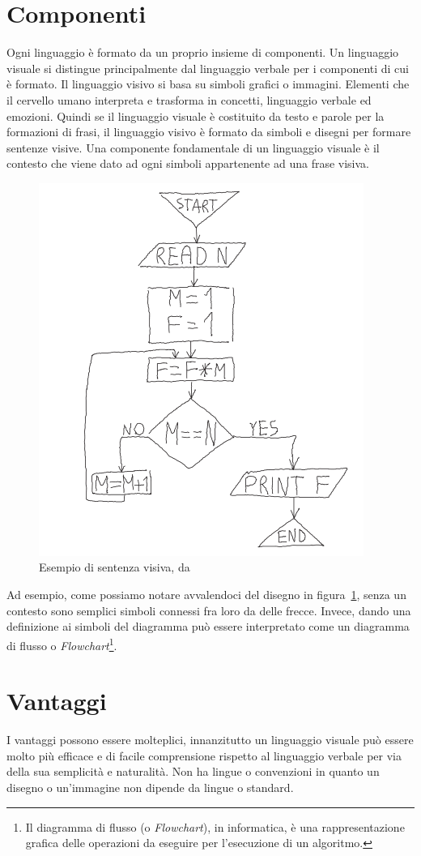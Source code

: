     \section{Componenti}
        Ogni linguaggio è formato da un proprio insieme di componenti. Un linguaggio visuale si distingue principalmente dal linguaggio verbale per i componenti di cui è formato. Il linguaggio visivo si basa su simboli grafici o immagini. Elementi che il cervello umano interpreta e trasforma in concetti, linguaggio verbale ed emozioni. Quindi se il linguaggio visuale è costituito da testo e parole per la formazioni di frasi, il linguaggio visivo è formato da simboli e disegni per formare sentenze visive.
        Una componente fondamentale di un linguaggio visuale è il contesto che viene dato ad ogni simboli appartenente ad una frase visiva.
        \newline
        \begin{figure}[htbp]
            \centering
            \includegraphics[scale=0.6]{Figure/diagram.PNG}
            \caption{Esempio di sentenza visiva, da~\cite{localcontext_recognition}}
            \label{fig:diagram}
        \end{figure}
        \newline
        Ad esempio, come possiamo notare avvalendoci del disegno in figura~\ref{fig:diagram}, senza un contesto sono semplici simboli connessi fra loro da delle frecce. Invece, dando una definizione ai simboli del diagramma può essere interpretato come un diagramma di flusso o \textit{Flowchart}\footnote{Il diagramma di flusso (o \textit{Flowchart}), in informatica, è una rappresentazione grafica delle operazioni da eseguire per l'esecuzione di un algoritmo.}.

    \section{Vantaggi}
        I vantaggi possono essere molteplici, innanzitutto un linguaggio visuale può essere molto più efficace e di facile comprensione rispetto al linguaggio verbale per via della sua semplicità e naturalità. Non ha lingue o convenzioni in quanto un disegno o un'immagine non dipende da lingue o standard.